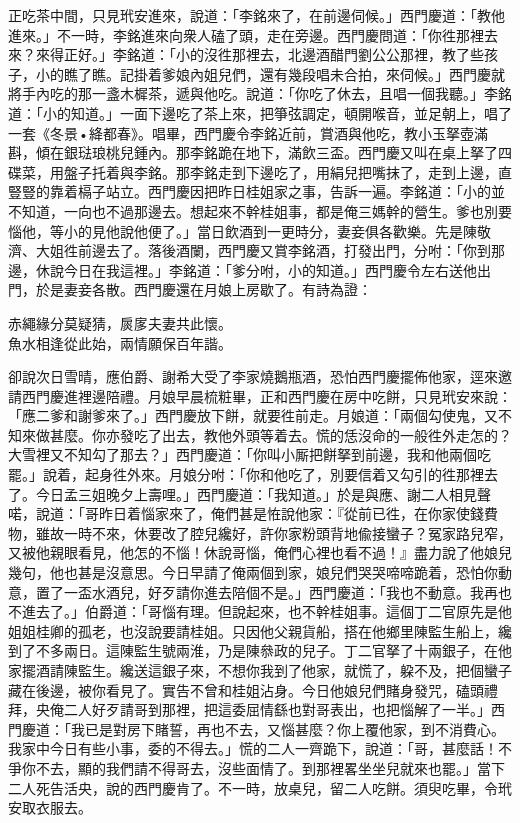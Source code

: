 正吃茶中間，只見玳安進來，說道：「李銘來了，在前邊伺候。」西門慶道：「教他進來。」不一時，李銘進來向衆人磕了頭，走在旁邊。西門慶問道：「你徃那裡去來？來得正好。」李銘道：「小的沒徃那裡去，北邊酒醋門劉公公那裡，教了些孩子，小的瞧了瞧。記掛着爹娘內姐兒們，還有幾段唱未合拍，來伺候。」西門慶就將手內吃的那一盞木樨茶，遞與他吃。說道：「你吃了休去，且唱一個我聽。」李銘道：「小的知道。」一面下邊吃了茶上來，把箏弦調定，頓開喉音，並足朝上，唱了一套《冬景•絳都春》。唱畢，西門慶令李銘近前，賞酒與他吃，教小玉拏壺滿斟，傾在銀琺琅桃兒鍾內。那李銘跪在地下，滿飲三盃。西門慶又叫在桌上拏了四碟菜，用盤子托着與李銘。那李銘走到下邊吃了，用絹兒把嘴抹了，走到上邊，直豎豎的靠着槅子站立。西門慶因把昨日桂姐家之事，告訴一遍。李銘道：「小的並不知道，一向也不過那邊去。想起來不幹桂姐事，都是俺三媽幹的營生。{}爹也別要惱他，等小的見他說他便了。」當日飲酒到一更時分，妻妾俱各歡樂。先是陳敬濟、大姐徃前邊去了。落後酒闌，西門慶又賞李銘酒，打發出門，分咐：「你到那邊，休說今日在我這裡。」李銘道：「爹分咐，小的知道。」西門慶令左右送他出門，於是妻妾各散。西門慶還在月娘上房歇了。有詩為證：

\begin{myquote} 
赤繩緣分莫疑猜，扊扅夫妻共此懷。\\魚水相逢從此始，兩情願保百年諧。
\end{myquote} 

卻說次日雪晴，應伯爵、謝希大受了李家燒鵝瓶酒，恐怕西門慶擺佈他家，逕來邀請西門慶進裡邊陪禮。月娘早晨梳粧畢，正和西門慶在房中吃餅，只見玳安來說：「應二爹和謝爹來了。」西門慶放下餅，就要徃前走。月娘道：「兩個勾使鬼，又不知來做甚麼。你亦發吃了出去，教他外頭等着去。慌的恁沒命的一般徃外走怎的？大雪裡又不知勾了那去？」西門慶道：「你叫小厮把餅拏到前邊，我和他兩個吃罷。」說着，起身徃外來。月娘分咐：「你和他吃了，別要信着又勾引的徃那裡去了。今日孟三姐晚夕上壽哩。」西門慶道：「我知道。」於是與應、謝二人相見聲喏，說道：「哥昨日着惱家來了，俺們甚是恠說他家：『從前已徃，在你家使錢費物，雖故一時不來，休要改了腔兒纔好，許你家粉頭背地偸接蠻子？冤家路兒窄，又被他親眼看見，他怎的不惱！休說哥惱，俺們心裡也看不過！』盡力說了他娘兒幾句，他也甚是沒意思。今日早請了俺兩個到家，娘兒們哭哭啼啼跪着，恐怕你動意，置了一盃水酒兒，好歹請你進去陪個不是。」{}西門慶道：「我也不動意。我再也不進去了。」伯爵道：「哥惱有理。但說起來，也不幹桂姐事。這個丁二官原先是他姐姐桂卿的孤老，也沒說要請桂姐。只因他父親貨船，搭在他鄉里陳監生船上，纔到了不多兩日。這陳監生號兩淮，乃是陳叅政的兒子。丁二官拏了十兩銀子，在他家擺酒請陳監生。纔送這銀子來，不想你我到了他家，就慌了，躱不及，把個蠻子藏在後邊，被你看見了。實告不曾和桂姐沾身。今日他娘兒們賭身發咒，磕頭禮拜，央俺二人好歹請哥到那裡，把這委屈情繇也對哥表出，也把惱解了一半。」西門慶道：「我已是對房下賭誓，再也不去，又惱甚麼？你上覆他家，到不消費心。我家中今日有些小事，委的不得去。」慌的二人一齊跪下，{}說道：「哥，甚麼話！不爭你不去，顯的我們請不得哥去，沒些面情了。到那裡畧坐坐兒就來也罷。」當下二人死告活央，說的西門慶肯了。不一時，放桌兒，留二人吃餅。須臾吃畢，令玳安取衣服去。

